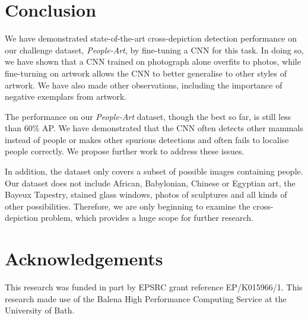 \documentclass[runningheads]{llncs}
\begin{document}
\section{Conclusion}
We have demonstrated state-of-the-art cross-depiction detection performance on our challenge dataset, \textit{People-Art}, by fine-tuning a \ac{CNN} for this task.
In doing so, we have shown that a \ac{CNN} trained on photograph alone overfits to \acp{photo}, while fine-turning on \ac{artwork} allows the \ac{CNN} to better generalise to other styles of \ac{artwork}.
We have also made other observations, including the importance of negative exemplars from \ac{artwork}.

The performance on our \textit{People-Art} dataset, though the best so far, is still less than 60\% \ac{AP}.
We have demonstrated that the \ac{CNN} often detects other mammals instead of people or makes other spurious detections and often fails to localise people correctly.
We propose further work to address these issues.

In addition, the dataset only covers a subset of possible images containing people.
Our dataset does not include African, Babylonian, Chinese or Egyptian art, the Bayeux Tapestry, stained glass windows, photos of sculptures and all kinds of other possibilities.
Therefore, we are only beginning to examine the cross-depiction problem, which provides a huge scope for further research.
 
\section*{Acknowledgements}
This research was funded in part by EPSRC grant reference EP/K015966/1.
This research made use of the Balena High Performance Computing Service at the University of Bath.









\end{document}
